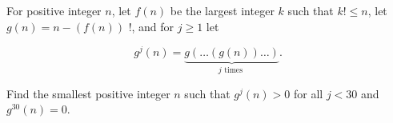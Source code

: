 For positive integer $n$, let $f(n)$ be the largest integer $k$ such that $k!\leq n$, let $g(n)=n-(f(n))$ !, and for $j \geq 1$ let

$$
g^{j}(n)=\underbrace{g(\ldots(g(n)) \ldots)}_{j \text { times }} .
$$

Find the smallest positive integer $n$ such that $g^{j}(n)>0$ for all $j<30$ and $g^{30}(n)=0$.